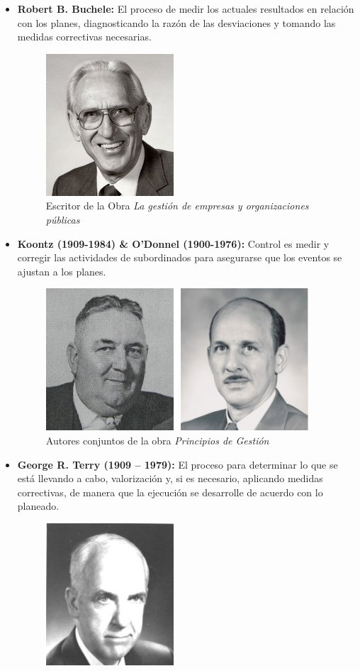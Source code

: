 \documentclass[12pt,letterpaper]{article}
\begin{document}
\begin{itemize}
\item \textbf{Robert B. Buchele:} El proceso de medir los actuales resultados en relación con los planes, diagnosticando la razón de las desviaciones y tomando las medidas correctivas necesarias.
\begin{figure}[h]
\centering
\includegraphics[scale=0.5]{Buchele}
\caption{Escritor de la Obra \textit{La gestión de empresas y organizaciones públicas}}
\end{figure}
\item \textbf{Koontz (1909-1984) \& O'Donnel (1900-1976):} Control es medir y corregir las actividades de subordinados para asegurarse que los eventos se ajustan a los planes.
\begin{figure}[h]
\centering
\includegraphics[scale=0.5]{KoonzODon}
\caption{Autores conjuntos de la obra \textit{Principios de Gestión} }
\end{figure}
\item \textbf{George R. Terry (1909 – 1979):} El proceso para determinar lo que se está llevando a cabo, valorización y, si es necesario, aplicando medidas correctivas, de manera que la ejecución se desarrolle de acuerdo con lo planeado.
\begin{figure}[h]
\centering
\includegraphics[scale=0.5]{Terry} 

\end{figure}
\end{itemize}
\end{document}

